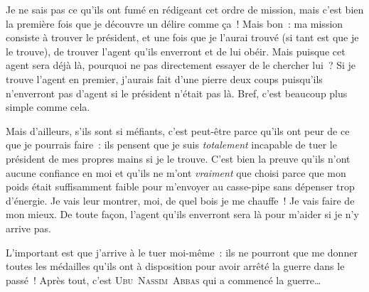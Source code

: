 {	Je ne sais pas ce qu’ils ont fumé en rédigeant cet ordre de mission, mais c’est bien la première fois que je découvre un délire comme ça~!
	Mais bon~:  ma mission consiste à trouver le président, et une fois que je l’aurai trouvé (si tant est que je le trouve), de trouver l’agent qu’ils enverront et de lui obéir.
	Mais puisque cet agent sera déjà là, pourquoi ne pas directement essayer de le chercher lui~?  Si je trouve l’agent en premier, j’aurais fait d’une pierre deux coups puisqu’ils n’enverront pas d’agent si le président n’était pas là.
	Bref, c’est beaucoup plus simple comme cela.

	Mais d’ailleurs, s’ils sont si méfiants, c’est peut-être parce qu’ils ont peur de ce que je pourrais faire~:  ils pensent que je suis \emph{totalement} incapable de tuer le président de mes propres mains si je le trouve.
	C’est bien la preuve qu’ils n’ont aucune confiance en moi et qu’ils ne m’ont \emph{vraiment} que choisi parce que mon poids était suffisamment faible pour m’envoyer au casse-pipe sans dépenser trop d’énergie.
	Je vais leur montrer, moi, de quel bois je me chauffe~!  Je vais faire de mon mieux.
	De toute façon, l’agent qu’ils enverront sera là pour m’aider si je n’y arrive pas.

	L’important est que j’arrive à le tuer moi-même~:  ils ne pourront que me donner toutes les médailles qu’ils ont à disposition pour avoir arrêté la guerre dans le passé~!
	Après tout, c’est \textsc{Ubu~Nassim~Abbas} qui a commencé la guerre…
}

